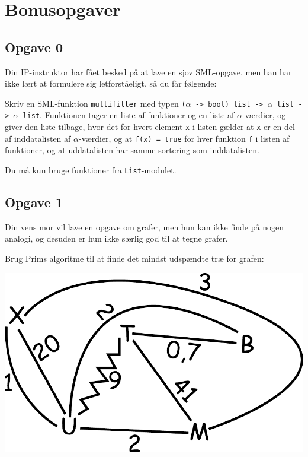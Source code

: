\section{\huge{Bonusopgaver}}

\setlength{\parindent}{3mm}

\subsection{Opgave 0}

Din IP-instruktor har fået besked på at lave en sjov SML-opgave, men han har
ikke lært at formulere sig letforståeligt, så du får følgende:

Skriv en SML-funktion \texttt{multifilter} med typen \texttt{($\alpha$ -> bool)
  list -> $\alpha$ list -> $\alpha$ list}.  Funktionen tager en liste af
funktioner og en liste af $\alpha$-værdier, og giver den liste tilbage, hvor det
for hvert element \texttt{x} i listen gælder at \texttt{x} er en del af
inddatalisten af $\alpha$-værdier, og at \texttt{f(x) = true} for hver funktion
\texttt{f} i listen af funktioner, og at uddatalisten har samme sortering som
inddatalisten.

Du må kun bruge funktioner fra \texttt{List}-modulet.


\subsection{Opgave 1}

Din vens mor vil lave en opgave om grafer, men hun kan ikke finde på nogen
analogi, og desuden er hun ikke særlig god til at tegne grafer.

Brug Prims algoritme til at finde det mindst udspændte træ for grafen:
\begin{center}
\includegraphics[width=.8\textwidth]{figures/graf.pdf}
\end{center}


